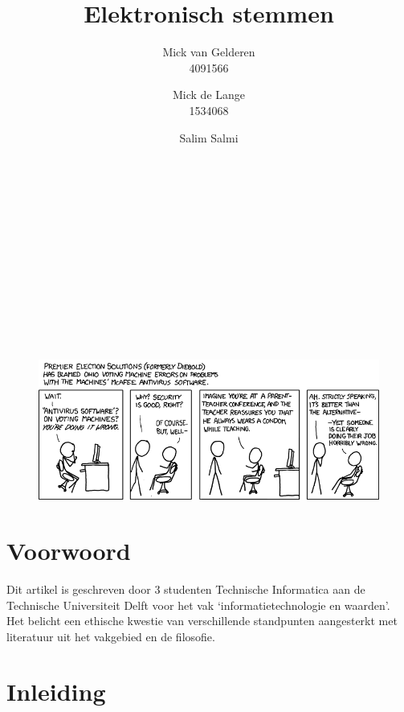 \documentclass[a4paper]{article}
\title{Elektronisch stemmen}
\author{
Mick van Gelderen \\ 4091566 \and 
Mick de Lange \\ 1534068 \and
Salim Salmi \\ \TODO{stdnr}
}
\begin{document}
\thispagestyle{plain}
\maketitle

\hfill \\ \\ \\ \\ \\ \\ \\ \\ \\ \\
\begin{figure}[htp]
\centering
\includegraphics[width=\textwidth]{media/voting_machines.png}
\label{fig:voting-machines}

\end{figure}

\newpage

\thispagestyle{plain}

\section*{Voorwoord}
Dit artikel is geschreven door 3 studenten Technische Informatica aan de Technische Universiteit Delft voor het vak `informatietechnologie en waarden'.
Het belicht een ethische kwestie van verschillende standpunten aangesterkt met literatuur uit het vakgebied en de filosofie. 

\newpage

\thispagestyle{plain}
\renewcommand{\contentsname}{Inhoud} 
\tableofcontents

\newpage

\section{Inleiding}
\end{document}

